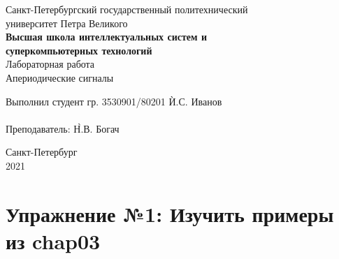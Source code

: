 \documentclass[a4paper, 14pt]{extarticle}
\begin{document}
    \begin{center}
        \begin{center}
            \hfill \break
            \normalsize{Санкт-Петербургский государственный политехнический}\\
            \normalsize{университет Петра Великого}\\
            \hfill \break
            \normalsize{\textbf{Высшая школа интеллектуальных систем и}}\\
            \normalsize{\textbf{суперкомпьютерных технологий}}\\
            \hfill \break
            \hfill \break
            \hfill \break
            \normalsize{Лабораторная работа}\\
            \hfill \break
            \normalsize{\LARGE Апериодические сигналы}\\
        \end{center}
        \hfill \break
        \hfill \break
        \hfill \break
        \hfill \break
        \hfill \break
        \hfill \break
        \hfill \break
        \hfill \break
        \hfill \break
        \hfill \break
        \begin{tabbing}
            Выполнил студент гр. 3530901/80201 \`И.С. Иванов\\
            \\
            Преподаватель: \`Н.В. Богач\\
        \end{tabbing}
        \hfill \break
        \hfill \break
        \hfill \break
        \hfill \break
        \begin{center}
            Санкт-Петербург\\
            2021
        \end{center}
        \thispagestyle{empty}
    \end{center}

    \newpage
    \tableofcontents

    \newpage
    \listoffigures

    \newpage
    \lstlistoflistings

    \newpage


    \section{Упражнение №1: Изучить примеры из chap03}
    \label{sec:1_study_examples}
\end{document}
